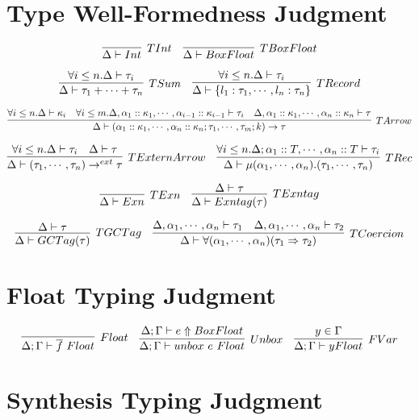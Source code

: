 \documentclass{article}
\begin{document}
\section{Type Well-Formedness Judgment}

$$
\infer[TInt]{\Delta \vdash \TInt}{}
\quad
\infer[TBoxFloat]{\Delta \vdash \BoxFloat}{}
$$

$$
\infer[TSum]{\Delta \vdash \tau_1 + \cdots + \tau_n}
{
	\forall i \leq n . \Delta \vdash \tau_i
}
\quad
\infer[TRecord]{\Delta \vdash \Record{l_1: \tau_1, \cdots, l_n: \tau_n}}
{
	\forall i \leq n . \Delta \vdash \tau_i
}
$$

$$
\infer[TArrow]{\Delta \vdash \Arrow{\alpha_1::\kappa_1,\cdots,\alpha_n::\kappa_n}{\tau_1,\cdots,\tau_m}{k}{\tau}}
{
	\forall i \leq n . \Delta \vdash \kappa_i
	\quad \forall i \leq m . \Delta, \alpha_1::\kappa_1, \cdots, \alpha_{i-1}::\kappa_{i-1} \vdash \tau_i
	\quad \Delta, \alpha_1::\kappa_1, \cdots, \alpha_n::\kappa_n \vdash \tau
}
$$

$$
\infer[TExternArrow]{\Delta \vdash \ExternArrow{\tau_1,\cdots,\tau_n}{\tau}}
{
	\forall i \leq n . \Delta \vdash \tau_i
	\quad \Delta \vdash \tau
}
\quad
\infer[TRec]{\Delta \vdash \Rec{\alpha_1,\cdots,\alpha_n}{\tau_1,\cdots,\tau_n}}
{
	\forall i \leq n . \Delta; \alpha_1::T, \cdots, \alpha_n::T \vdash \tau_i
}
$$

$$
\infer[TExn]{\Delta \vdash \Exn}{}
\quad
\infer[TExntag]{\Delta \vdash \Exntag{\tau}}
{
	\Delta \vdash \tau
}
$$

$$
\infer[TGCTag]{\Delta \vdash \GCTag{\tau}}
{
	\Delta \vdash \tau
}
\quad
\infer[TCoercion]{\Delta \vdash \Coercion{\alpha_1,\cdots,\alpha_n}{\tau_1}{\tau_2}}
{
	\Delta, \alpha_1, \cdots, \alpha_n \vdash \tau_1
	\quad \Delta, \alpha_1, \cdots, \alpha_n \vdash \tau_2
}
$$

\section{Float Typing Judgment}

$$
\infer[Float]{\Delta; \Gamma \vdash \overline f\ \Float}
{
}
\quad
\infer[Unbox]{\Delta; \Gamma \vdash \Unboxf{e}\ \Float}
{
	\Delta; \Gamma \vdash e \Uparrow \BoxedFloat
}
\quad
\infer[FVar]{\Delta; \Gamma \vdash y \Float}
{
	y \in \Gamma
}
$$

\section{Synthesis Typing Judgment}
\end{document}
